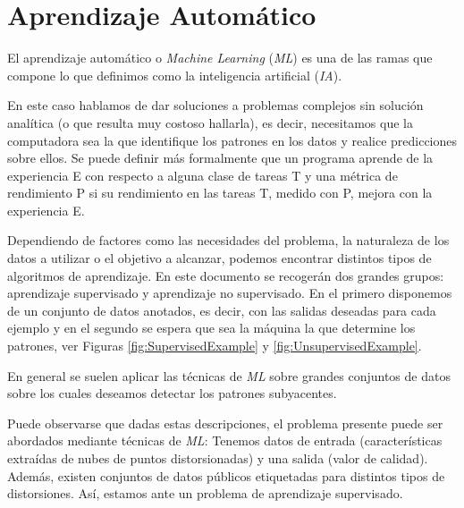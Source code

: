 \section{Aprendizaje Automático}
El aprendizaje automático\cite{IAModernApproach} o \emph{Machine Learning} (\emph{ML}) 
es una de las ramas que compone lo que definimos como 
la inteligencia artificial (\emph{IA}). 

En este caso hablamos de dar soluciones a problemas complejos sin 
solución analítica (o que resulta muy costoso hallarla), es decir, necesitamos que la computadora sea la que identifique
los patrones en los datos y realice predicciones sobre ellos\cite{LearningFromData}.
Se puede definir más formalmente que un programa aprende de la experiencia E con
respecto a alguna clase de tareas T y una métrica de rendimiento P si su
rendimiento en las tareas T, medido con P, mejora con la experiencia E\cite{TomMitchell}.

Dependiendo de factores como las necesidades del problema, la naturaleza
de los datos a utilizar o el objetivo a alcanzar, podemos encontrar distintos tipos de
algoritmos de aprendizaje. En este documento se recogerán dos grandes grupos: aprendizaje supervisado 
y aprendizaje no supervisado. En el primero disponemos de un conjunto de datos 
anotados, es decir, con las salidas deseadas para cada ejemplo y en el segundo 
se espera que sea la máquina la que determine los patrones, ver Figuras \ref{fig:SupervisedExample} y \ref{fig:UnsupervisedExample}. 

En general se suelen aplicar las técnicas de \emph{ML} sobre grandes conjuntos 
de datos sobre los cuales deseamos detectar los patrones subyacentes\cite{
DataMiningHandbook}.

Puede observarse que dadas estas descripciones, el problema presente puede ser 
abordados mediante técnicas de \emph{ML}: Tenemos datos de entrada (características 
extraídas de nubes de puntos distorsionadas) y una salida (valor de calidad). Además, existen conjuntos de 
datos públicos etiquetadas para distintos tipos de distorsiones. Así,
estamos ante un problema de aprendizaje supervisado.

